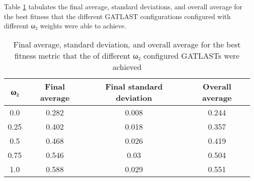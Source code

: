 Table \ref{tab:HP:GA:MWeight:best fitness} tabulates the final average, standard deviations, and overall average for the best fitness that the different GATLAST configurations configured with different ω₂ weights were able to achieve.
\begin{table}[tbh!]
\centering
\begin{adjustbox}{trim=0cm 0cm 0cm 0cm, clip=true}
\begin{tabular}{|c|c|c|c|}
\hline
ω₂ & Final average & Final standard deviation & Overall average\\
\hline
0.0 & 0.282 & 0.008 & 0.244\\\hline
0.25 & 0.402 & 0.018 & 0.357\\\hline
0.5 & 0.468 & 0.026 & 0.419\\\hline
0.75 & 0.546 & 0.03 & 0.504\\\hline
1.0 & 0.588 & 0.029 & 0.551\\\hline
\end{tabular}
\end{adjustbox}
\caption{Final average, standard deviation, and overall average for the best fitness metric that the of different ω₂ configured GATLASTs were achieved}
\label{tab:HP:GA:MWeight:best fitness}
\end{table}